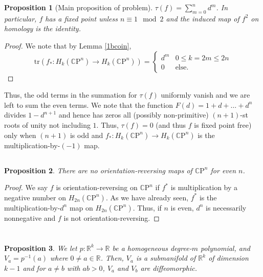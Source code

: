 \documentclass[english]{article}
\newcommand{\RR}{\mathbb{R}}
\newcommand{\CC}{\mathbb{C}}
\newcommand{\prob}[1]{\setcounter{section}{#1-1}\section{}}
\newcommand{\prt}[1]{\setcounter{subsection}{#1-1}\subsection{}}
\newtheorem*{proposition*}{Proposition}
\theoremstyle{remark}
\theoremstyle{definition}
\newcommand{\CP}{{\CC\mathrm{P}}}
\begin{document}
\begin{proposition*}[Main proposition of problem]
	$\tau(f)=\sum_{m=0}^nd^m$. In particular, $f$ has a fixed point unless $n\equiv 1 \mod 2$ and the induced map of $f^2$ on homology is the identity.  
\end{proposition*}
\begin{proof}
	We note that by Lemma \ref{1bcoin}, \begin{equation*}\mathrm{tr}(f_*:H_k(\CP^n)\to H_k(\CP^n))=\begin{cases}
d^m&0\leq k=2m\leq 2n\\0&\text{else}.
	\end{cases}\end{equation*}
\end{proof}
Thus, the odd terms in the summation for $\tau(f)$ uniformly vanish and we are left to sum the even terms. We note that the function $F(d)=1+d+\ldots+d^n$ divides $1-d^{n+1}$ and hence has zeros all (possibly non-primitive) $(n+1)$-st roots of unity not including $1$. Thus, $\tau(f)=0$ (and thus $f$ is fixed point free) only when $(n+1)$ is odd and $f_*:H_k(\CP^n)\to H_k(\CP^n)$ is the multiplication-by-$(-1)$ map. 
\prt{3}
\begin{proposition*}
	There are no orientation-reversing maps of $\CP^n$ for even $n$.
\end{proposition*}
\begin{proof}
We say $f$ is orientation-reversing on $\CP^n$ if $f^*$ is multiplication by a negative number on $H_{2n}(\CP^n)$. As we have already seen, $f^*$ is the multiplication-by-$d^n$ map on $H_{2n}(\CP^n)$. Thus, if $n$ is even, $d^n$ is necessarily nonnegative and $f$ is not orientation-reversing.
\end{proof}
\prob{2}
\prob{3}
\begin{proposition*}
	We let $p:\RR^k\to \RR$ be a homogeneous degree-$m$ polynomial, and $V_a=p^{-1}(a)$ where $0\neq a\in \RR$. Then, $V_a$ is a submanifold of $\RR^k$ of dimension $k-1$ and for $a\neq b$ with $ab>0$, $V_a$ and $V_b$ are diffeomorphic.
\end{proposition*}
\end{document}
